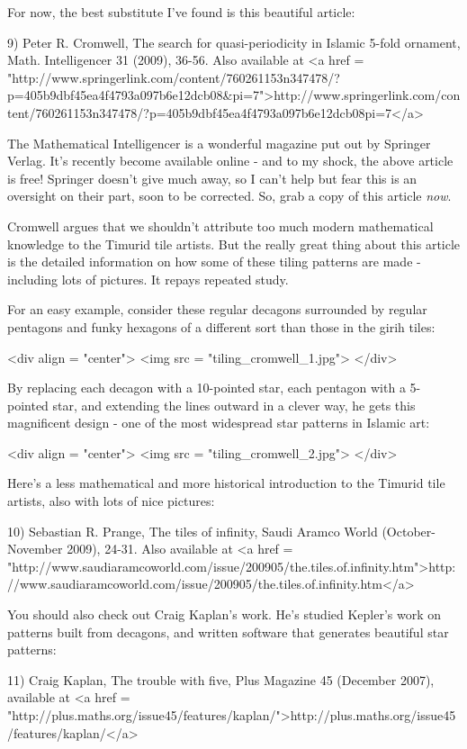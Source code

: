 For now, the best substitute I've found is this beautiful article:

9) Peter R. Cromwell, The search for quasi-periodicity in Islamic 
5-fold ornament, Math. Intelligencer 31 (2009), 36-56.
Also available at 
<a href = "http://www.springerlink.com/content/760261153n347478/?p=405b9dbf45ea4f4793a097b6e12dcb08&pi=7">http://www.springerlink.com/content/760261153n347478/?p=405b9dbf45ea4f4793a097b6e12dcb08pi=7</a>

The Mathematical Intelligencer is a wonderful magazine put out by
Springer Verlag.  It's recently become available online - and to my 
shock, the above article is free!  Springer doesn't give much away,
so I can't help but fear this is an oversight on their part, soon to
be corrected.  So, grab a copy of this article \emph{now}.

Cromwell argues that we shouldn't attribute too much modern
mathematical knowledge to the Timurid tile artists.  But the really
great thing about this article is the detailed information on how some
of these tiling patterns are made - including lots of pictures.  It
repays repeated study.

For an easy example, consider these regular decagons surrounded
by regular pentagons and funky hexagons of a different sort than 
those in the girih tiles:

<div align = "center">
<img src = "tiling_cromwell_1.jpg">
</div>

By replacing each decagon with a 10-pointed star, each pentagon
with a 5-pointed star, and extending the lines outward in a clever
way, he gets this magnificent design - one of the most widespread
star patterns in Islamic art:

<div align = "center">
<img src = "tiling_cromwell_2.jpg">
</div>

Here's a less mathematical and more historical introduction to the
Timurid tile artists, also with lots of nice pictures:

10) Sebastian R. Prange, The tiles of infinity, Saudi Aramco World
(October-November 2009), 24-31.  Also available at
<a href = "http://www.saudiaramcoworld.com/issue/200905/the.tiles.of.infinity.htm">http://www.saudiaramcoworld.com/issue/200905/the.tiles.of.infinity.htm</a>

You should also check out Craig Kaplan's work.  He's studied Kepler's
work on patterns built from decagons, and written software that 
generates beautiful star patterns:

11) Craig Kaplan, The trouble with five, Plus Magazine 45 (December
2007), available at
<a href = "http://plus.maths.org/issue45/features/kaplan/">http://plus.maths.org/issue45/features/kaplan/</a>
 
